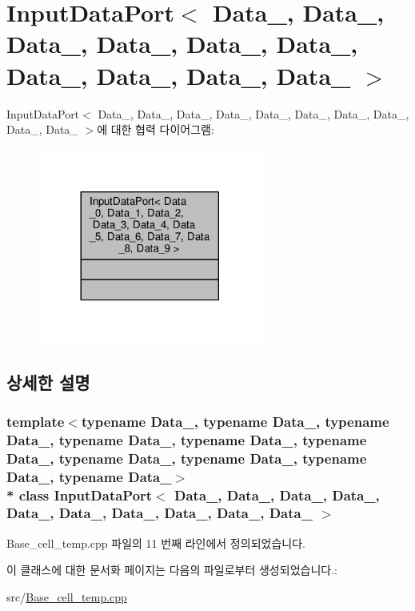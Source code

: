 \hypertarget{classInputDataPort}{}\section{Input\+Data\+Port$<$ Data\+\_, Data\+\_, Data\+\_, Data\+\_, Data\+\_, Data\+\_, Data\+\_, Data\+\_, Data\+\_, Data\+\_ $>$}
\label{classInputDataPort}


Input\+Data\+Port$<$ Data\+\_, Data\+\_, Data\+\_, Data\+\_, Data\+\_, Data\+\_, Data\+\_, Data\+\_, Data\+\_, Data\+\_ $>$에 대한 협력 다이어그램\+:\nopagebreak
\begin{figure}[H]
\begin{center}
\leavevmode
\includegraphics[width=209pt]{classInputDataPort__coll__graph}
\end{center}
\end{figure}


\subsection{상세한 설명}
\subsubsection*{template$<$typename Data\+\_, typename Data\+\_, typename Data\+\_, typename Data\+\_, typename Data\+\_, typename Data\+\_, typename Data\+\_, typename Data\+\_, typename Data\+\_, typename Data\+\_$>$\\*
class Input\+Data\+Port$<$ Data\+\_, Data\+\_, Data\+\_, Data\+\_, Data\+\_, Data\+\_, Data\+\_, Data\+\_, Data\+\_, Data\+\_ $>$}



Base\+\_\+cell\+\_\+temp.\+cpp 파일의 11 번째 라인에서 정의되었습니다.



이 클래스에 대한 문서화 페이지는 다음의 파일로부터 생성되었습니다.\+:\begin{DoxyCompactItemize}
\item 
src/\hyperlink{Base__cell__temp_8cpp}{Base\+\_\+cell\+\_\+temp.\+cpp}\end{DoxyCompactItemize}
